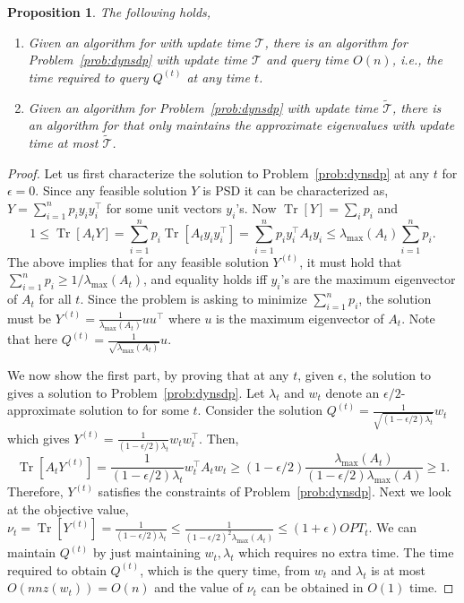 \documentclass[11pt]{article}
\newtheorem{proposition}[theorem]{Proposition}
\DeclareMathOperator{\Tr}{Tr}
\newcommand\uu{\boldsymbol{\mathit{u}}}
\newcommand\ww{\boldsymbol{\mathit{w}}}
\newcommand\yy{\boldsymbol{\mathit{y}}}
\renewcommand\AA{\boldsymbol{\mathit{A}}}
\newcommand\QQ{\boldsymbol{\mathit{Q}}}
\newcommand\YY{\boldsymbol{\mathit{Y}}}
\begin{document}
\begin{proposition}\label{prop:equiv sdp}
The following holds,
\begin{enumerate}
    \item Given an algorithm for  with update time $\mathcal{T}$, there is an algorithm for Problem~\ref{prob:dynsdp} with update time 
 $\mathcal{T}$ and query time $O(n)$, i.e., the time required to query $\QQ^{(t)}$ at any time $t$. 
    \item Given an algorithm for Problem~\ref{prob:dynsdp} with update time $\widetilde{\mathcal{T}}$, there is an algorithm for  that only maintains the approximate eigenvalues with update time at most $\widetilde{\mathcal{T}}$.
\end{enumerate}
\end{proposition}
\begin{proof}
  Let us first characterize the solution to Problem~\ref{prob:dynsdp} at any $t$ for $\epsilon=0$. Since any feasible solution $\YY$ is PSD it can be characterized as, $\YY = \sum_{i=1}^n p_i \yy_i\yy_i^{\top}$ for some unit vectors $\yy_i$'s. Now $\Tr[\YY] = \sum_i p_i$ and
  \[
 1\leq  \Tr[\AA_t\YY] = \sum_{i=1}^n p_i \Tr[\AA_t \yy_i\yy_i^{\top}] = \sum_{i=1}^n p_i \yy_i^{\top}\AA_t\yy_i \leq \lambda_{\max}(\AA_t) \sum_{i=1}^n p_i.
  \]
  The above implies that for any feasible solution $\YY^{(t)}$, it must hold that $\sum_{i=1}^n p_i\geq 1/\lambda_{\max}(\AA_t)$, and equality holds iff $\yy_i$'s are the maximum eigenvector of $\AA_t$ for all $t$. Since the problem is asking to minimize $\sum_{i=1}^n p_i$, the solution must be $\YY^{(t)} = \frac{1}{\lambda_{\max}(\AA_t)}\uu\uu^{\top}$ where $\uu$ is the maximum eigenvector of $\AA_t$. Note that here $\QQ^{(t)} = \frac{1}{\sqrt{\lambda_{\max}(\AA_t)}}\uu$. 

  We now show the first part, by proving that at any $t$, given $\epsilon$, the solution to  gives a solution to Problem~\ref{prob:dynsdp}. Let $\lambda_t$ and $\ww_t$ denote an $\epsilon/2$-approximate solution to  for some $t$. Consider the solution $\QQ^{(t)} = \frac{1}{\sqrt{(1-\epsilon/2)\lambda_t}}\ww_t$ which gives $\YY^{(t)} = \frac{1}{(1-\epsilon/2)\lambda_t}\ww_t\ww_t^{\top}$. Then,
  \[\Tr[\AA_t\YY^{(t)}] = \frac{1}{(1-\epsilon/2)\lambda_t} \ww_t^{\top}\AA_t\ww_t \geq (1-\epsilon/2)\frac{\lambda_{\max}(\AA_t)}{(1-\epsilon/2)\lambda_{\max}(\AA)}\geq 1.\]
Therefore, $\YY^{(t)}$ satisfies the constraints of Problem~\ref{prob:dynsdp}. Next we look at the objective value, $\nu_t = \Tr[\YY^{(t)}] = \frac{1}{(1-\epsilon/2)\lambda_t} \leq \frac{1}{(1-\epsilon/2)^2\lambda_{\max}(\AA_t)} \leq (1+\epsilon) OPT_t.$ We can maintain $\QQ^{(t)}$ by just maintaining $\ww_t,\lambda_t$ which requires no extra time. The time required to obtain $\QQ^{(t)}$, which is the query time, from $\ww_t$ and $\lambda_t$ is at most $O(nnz(\ww_t))=O(n)$ and the value of $\nu_t$ can be obtained in $O(1)$ time. 


\end{proof}
\end{document}
